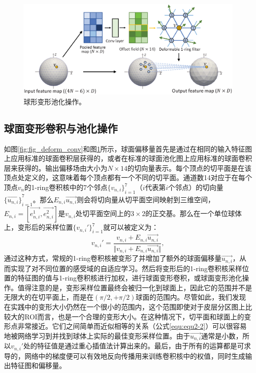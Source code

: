 \begin{figure}[t]
	\centering
	\includegraphics[width=0.85\linewidth]{figure/spheircal_deform_pool.eps}
	\caption{球形变形池化操作。}
	\label{fig:fig_deform_pool}
\end{figure}

\subsection{球面变形卷积与池化操作}
如图\ref{fig:fig_deform_conv}和图\ref{fig:fig_deform_pool}所示，球面偏移量首先是通过在相同的输入特征图上应用标准的球面卷积层获得的，或者在标准的球面池化图上应用标准的球面卷积层来获得的。输出偏移场由大小为$N\times 14$的切向量表示。每个顶点的切平面是在该顶点处定义的，这意味着每个顶点都有一个不同的切平面。通道数14对应于在每个顶点$v_n$的1-ring卷积核中的7个邻点${\{v_{n,i}\}}_{i=1}^7$（$i$代表第$i$个邻点）的切向量${\{\overrightarrow{u_{n,i}}\}}_{i=1}^7$。那么$E_{n,i}\overrightarrow{u_{n,i}}$则会将切向量从切平面空间映射到三维空间，$E_{n,i}=[\overrightarrow{e_{n,i}^1},\overrightarrow{e_{n,i}^2}]$是$v_{n,i}$处切平面空间上的$3\times 2$的正交基。那么在一个单位球体上，变形后的采样位置$\{v_{n,i}'\}_{i=1}^7$就可以被定义为：
\begin{equation}\label{equ:equ2-2}
v_{n,i}'=\frac{v_{n,i}+E_{n,i}\overrightarrow{u_{n,i}}}{\Vert v_{n,i}+E_{n,i}\overrightarrow{u_{n,i}}\Vert},
\end{equation}
通过这种方式，常规的1-ring卷积核被变形了并增加了额外的球面偏移量$\overrightarrow{u_{n,i}}$，从而实现了对不同位置的感受域的自适应学习。然后将变形后的1-ring卷积核采样位置的特征图的值与1-ring卷积核进行加权，进行球面变形卷积，或球面变形池化操作。值得注意的是，变形采样位置最终会被归一化到球面上，因此它的范围并不是无限大的在切平面上，而是在$(\pi/2,+\pi/2)$球面的范围内。尽管如此，我们发现在实践中的变形大小仍然在一个很小的范围内，这个范围即使对于皮层分区图上比较大的ROI而言，也是一个合理的变形大小。在这种情况下，切平面和球面上的变形点非常接近。它们之间简单而近似相等的关系（公式\ref{equ:equ2-2}）可以很容易地被网络学习到并找到球体上实际的最佳变形采样位置。由于$\overrightarrow{u_{n,i}}$通常是小数，所以$v_{n,i}'$处的特征值是通过重心插值法\cite{yeo2009spherical}计算出来的。最后，由于所有的运算都是可求导的，网络中的梯度便可以有效地反向传播用来训练卷积核中的权值，同时生成输出特征图和偏移量。

